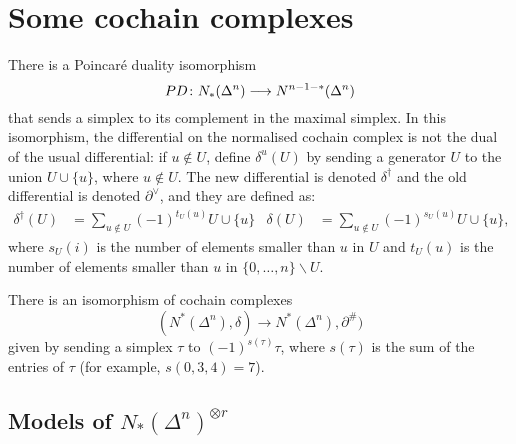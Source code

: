 
\section{Some cochain complexes}

There is a Poincaré duality isomorphism
\[PD\colon N_*(\Delta^n)\longrightarrow N^{n-1-*}(\Delta^n)\]
that sends a simplex to its complement in the maximal simplex. In this isomorphism, the differential on the normalised cochain complex is not the dual of the usual differential: if $u\notin U$, define $\delta^u(U)$ by sending a generator $U$ to the union $U\cup \{u\}$, where $u\notin U$. The new differential is denoted $\delta^\dagger$ and the old differential is denoted $\partial^{\vee}$, and they are defined as: 
\begin{align*}
    \delta^\dagger(U) &= \sum_{u\notin U} (-1)^{t_U(u)}U\cup \{u\}
    &
    \delta(U) &= \sum_{u\notin U}(-1)^{s_U(u)}U\cup \{u\},
\end{align*}
where $s_U(i)$ is the number of elements smaller than $u$ in $U$ and $t_U(u)$ is the number of elements smaller than $u$ in $\{0,\ldots,n\}\smallsetminus U$.

There is an isomorphism of cochain complexes
\[(N^*(\Delta^n),\delta)\longrightarrow N^*(\Delta^n),\partial^\#)\]
given by sending a simplex $\tau$ to $(-1)^{s(\tau)}\tau$, where $s(\tau)$ is the sum of the entries of $\tau$ (for example, $s(0,3,4) = 7$).

\subsection{Models of $N_*(\Delta^n)^{\otimes r}$}

